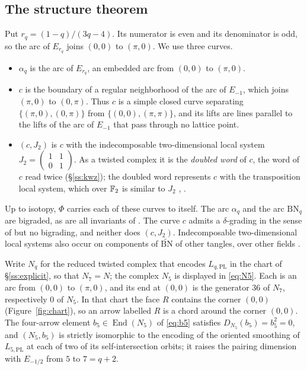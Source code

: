 \subsection{The structure theorem}\label{ss:kh-structure}
Put $r_q=(1-q)/(3q-4)$.  Its numerator is even and its denominator is odd, so the arc of $E_{r_q}$
joins $(0,0)$ to $(\pi,0)$.  We use three curves.
\begin{itemize}
\item $\alpha_q$ is the arc of $E_{r_q}$, an embedded arc from $(0,0)$ to $(\pi,0)$.
\item $c$ is the boundary of a regular neighborhood of the arc of $E_{-1}$, which joins $(\pi,0)$ to
 $(0,\pi)$.  Thus $c$ is a simple closed curve separating $\{(\pi,0),(0,\pi)\}$ from
 $\{(0,0),(\pi,\pi)\}$, and its lifts are lines parallel to the lifts of the arc of $E_{-1}$ that
 pass through no lattice point.
\item $(c,J_2)$ is $c$ with the indecomposable two-dimensional local system
 $J_2=\left(\begin{smallmatrix}1&1\\0&1\end{smallmatrix}\right)$.  As a twisted complex it is the
 \emph{doubled word} of $c$, the word of $c$ read twice (\S\ref{ss:kwz}); the doubled word represents $c$
 with the transposition local system, which over
 $\mathbb{F}_2$ is similar to $J_2$ \cite[\S5.3]{KWZ}, \cite[Lem.~2.24]{AurouxSmith}.
\end{itemize}
Up to isotopy, $\Phi$ carries each of these curves to itself.  The arc $\alpha_q$ and the arc
$\mathrm{BN}_q$ are bigraded, as are all invariants of \cite{KWZ}.  The curve $c$ admits a
$\delta$-grading in the sense of \cite[Def.~4.28]{Zibrowius} but no bigrading, and neither does
$(c,J_2)$.  Indecomposable two-dimensional local systems also occur on components of
$\widetilde{\mathrm{BN}}$ of other tangles, over other fields \cite[Rem.~3.20]{KWZmut}.

Write $N_q$ for the reduced twisted complex that encodes $L_{q,\mathrm{PL}}$ in the chart of
\S\ref{ss:explicit}, so that $N_7=N$; the complex $N_5$ is displayed in \eqref{eq:N5}.  Each is an arc
from $(0,0)$ to $(\pi,0)$, and its end at $(0,0)$ is the generator $36$ of $N_7$, respectively $0$ of
$N_5$.  In that chart the face $R$ contains the corner $(0,0)$ (Figure~\ref{fig:chart}), so
an arrow labelled $R$ is a chord around the corner $(0,0)$.  The four-arrow element
$b_5\in\operatorname{End}(N_5)$ of \eqref{eq:b5} satisfies $D_{N_5}(b_5)=b_5^2=0$, and $(N_5,b_5)$ is
strictly isomorphic to the encoding of the oriented smoothing of $L_{5,\mathrm{PL}}$ at each of two of its
self-intersection orbits; it raises the pairing dimension with $E_{-1/2}$ from $5$ to $7=q+2$.

